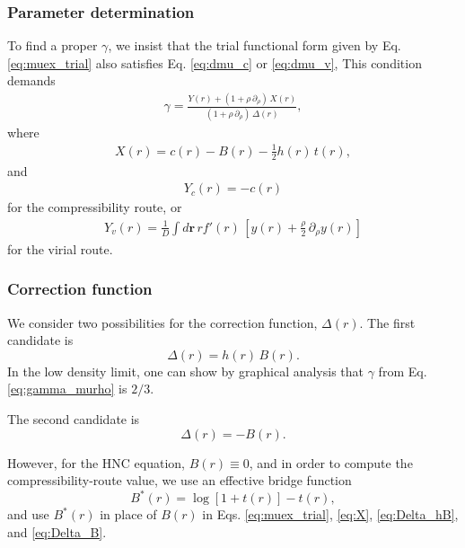 \documentclass[aip,jcp,reprint,superscriptaddress]{revtex4-1}
\newcommand{\vct}[1]{\mathbf{#1}}
\providecommand{\vr}{} %
\renewcommand{\vr}{\vct{r}}
\begin{document}
\subsubsection{Parameter determination}





To find a proper $\gamma$,
we insist that the trial functional form
given by Eq. \eqref{eq:muex_trial}
also satisfies
Eq. \eqref{eq:dmu_c} or \eqref{eq:dmu_v},
%
This condition demands
%
\begin{align}
\gamma
=
\frac{
  Y(r) + (1 + \rho \, \partial_\rho) \, X(r)
}
{
  (1 + \rho \, \partial_\rho) \, \Delta(r)
},
\label{eq:gamma_murho}
\end{align}
%
where
%
\begin{align}
X(r) = c(r) - B(r) - \frac{1}{2} h(r) \, t(r),
\label{eq:X}
\end{align}
%
and
\begin{align}
Y_c(r) = -c(r)
\label{eq:Yc}
\end{align}
for the compressibility route, or
\begin{align}
Y_v(r) = \frac{ 1 }{ D }
\int d\vr \, r f'(r) \,
\left[
	y(r) + \frac{\rho}{2} \, \partial_\rho y(r)
\right]
\label{eq:Yv}
\end{align}
for the virial route.





\subsubsection{Correction function}




We consider two possibilities for
the correction function, $\Delta(r)$.
%
The first candidate is
%
\begin{equation}
\Delta(r) = h(r) \, B(r).
\label{eq:Delta_hB}
\end{equation}
%
In the low density limit,
one can show by graphical analysis that
$\gamma$ from Eq. \eqref{eq:gamma_murho}
is $2/3$.



The second candidate is
%
\begin{equation}
\Delta(r) = -B(r).
\label{eq:Delta_B}
\end{equation}



However,
for the HNC equation,
$B(r) \equiv 0$,
and in order to compute
the compressibility-route value,
we use an effective bridge function
%
\begin{equation}
B^*(r) = \log\left[ 1 + t(r) \right] - t(r),
\label{eq:Beff_hnc}
\end{equation}
%
and use $B^*(r)$ in place of $B(r)$
in Eqs.
\eqref{eq:muex_trial},
\eqref{eq:X},
\eqref{eq:Delta_hB},
and
\eqref{eq:Delta_B}.
%
\end{document}
